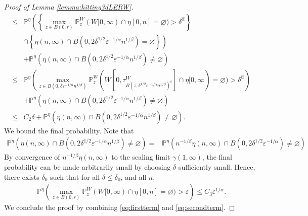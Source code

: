 \documentclass{article}
\renewcommand{\P}{\mathbb{P}}
\newcommand{\1}{\mathbf{1}}
\theoremstyle{definition}
\numberwithin{equation}{section}
\numberwithin{theorem}{section}
\begin{document}
\begin{proof}[Proof of Lemma \ref{lemma:hitting3dLERW}]
\begin{equation}
\begin{split}
        \leq&\P^{\eta}\left(\left\{\max_{z\in B(0,r)}\P_z^W(W[0,\infty)\cap\eta[0,n]=\varnothing)>\delta^{\hat\alpha}\right\}\right.\\
        &\left.\cap\left\{\eta(n,\infty)\cap B(0,2\delta^{1/2}\varepsilon^{-1/\alpha} n^{1/\beta})=\varnothing\right\}\right)\\
        &+\P^{\eta}\left(\eta(n,\infty)\cap B(0,2\delta^{1/2}\varepsilon^{-1/\alpha} n^{1/\beta})\neq\varnothing\right)\\
        \leq&\P^{\eta}\left(\max_{z\in B(0,\delta\varepsilon^{-1/\alpha}n^{1/\beta})}\P_z^W(W[0,\tau^W_{B(z,\delta^{1/2}\varepsilon^{-1/\alpha}n^{1/\beta})^c}]\cap\eta[0,\infty)=\varnothing)>\delta^{\hat\alpha}\right)\\
        &+\P^{\eta}\left(\eta(n,\infty)\cap B(0,2\delta^{1/2}\varepsilon^{-1/\alpha} n^{1/\beta})\neq\varnothing\right)\\
        \leq&C_2\delta+\P^{\eta}\left(\eta(n,\infty)\cap B(0,2\delta^{1/2}\varepsilon^{-1/\alpha} n^{1/\beta})\neq\varnothing\right).
    \end{split}
\end{equation}
We bound the final probability. Note that
\begin{equation}
    \begin{split}
        \P^{\eta}\left(\eta(n,\infty)\cap B(0,2\delta^{1/2}\varepsilon^{-1/\alpha} n^{1/\beta})\neq\varnothing\right)=&\P^{\eta}\left(n^{-1/\beta}\eta(n,\infty)\cap B(0,2\delta^{1/2}\varepsilon^{-1/\alpha})\neq\varnothing\right)
    \end{split}
\end{equation}
By convergence of $n^{-1/\beta}\eta(n,\infty)$ to the scaling limit $\gamma(1,\infty)$, the final probability can be made arbitrarily small by choosing $\delta$ sufficiently small. Hence, there exists $\delta_0$ such that for all $\delta\leq\delta_0$, and all $n$,
\begin{equation}\label{eq:secondterm}
    \begin{split}
        \P^{\eta}\left(\max_{z\in B(0,r)}\P_z^W(W[0,\infty)\cap\eta[0,n]=\varnothing)>\varepsilon\right)\leq C_3\varepsilon^{1/\alpha}.
    \end{split}
\end{equation}
We conclude the proof by combining \eqref{eq:firstterm} and \eqref{eq:secondterm}.
\end{proof}
\end{document}
